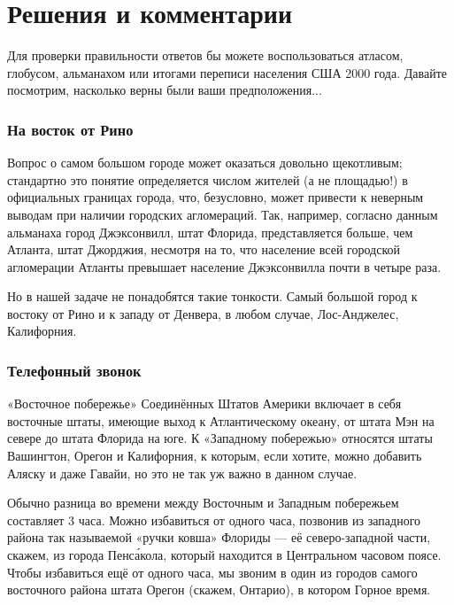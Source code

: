 \section*{Решения и комментарии}

Для проверки правильности ответов бы можете воспользоваться атласом, глобусом, альманахом или итогами переписи населения США 2000 года.
Давайте посмотрим, насколько верны были ваши предположения...

\subsubsection*{На восток от Рино}%

Вопрос о самом большом городе может оказаться довольно щекотливым; 
стандартно это понятие определяется числом жителей (а не площадью!) в официальных границах города, что, безусловно, может привести к неверным выводам
при наличии городских агломераций.
Так, например, согласно данным альманаха город Джэксонвилл, штат Флорида, представляется больше, чем Атланта, штат Джорджия, несмотря на то, что население всей городской агломерации Атланты превышает население Джэксонвилла почти в четыре раза.

\medskip

Но в нашей задаче не понадобятся такие тонкости.
Самый большой город к востоку от Рино и к западу от Денвера, в любом случае, Лос-Анджелес, Калифорния.
\heart

\subsubsection*{Телефонный звонок}%

«Восточное побережье» Соединённых Штатов Америки включает в себя восточные штаты, имеющие выход к Атлантическому океану, от штата Мэн на севере до штата Флорида на юге.
К «Западному побережью» относятся штаты Вашингтон, Орегон и Калифорния,
к которым, если хотите, можно добавить Аляску и даже Гавайи, но это не так уж важно в данном случае. %

Обычно разница во времени между Восточным и Западным побережьем составляет 3 часа.
Можно избавиться от одного часа, позвонив из западного района так называемой «ручки ковша» Флориды --- её северо-западной части, %
скажем, из города Пенс\'{а}кола, который находится в Центральном часовом поясе.
Чтобы избавиться ещё от одного часа, мы звоним в один из городов самого восточного района штата Орегон (скажем, Онтарио), в котором Горное время.

